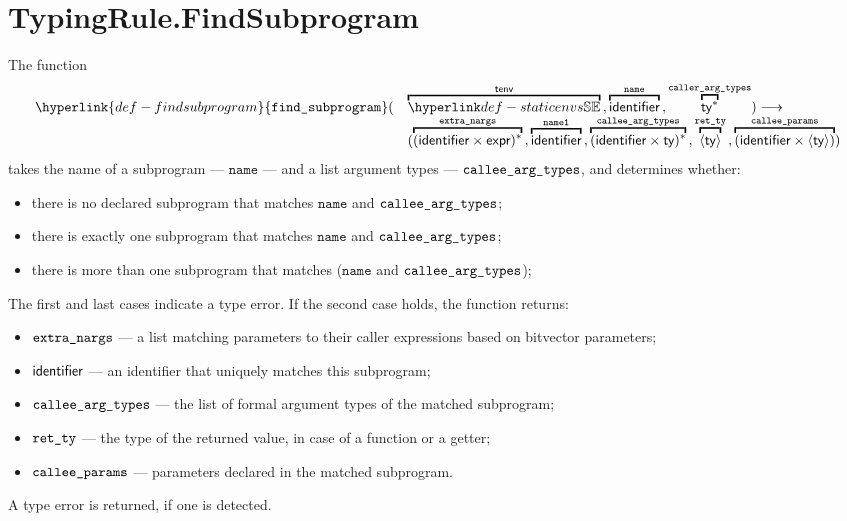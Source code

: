 \documentclass{book}
\newcommand\findsubprogram[0]{\hyperlink{def-findsubprogram}{\texttt{find\_subprogram}}}
\newcommand\nameone[0]{\texttt{name1}}
\newcommand\name[0]{\texttt{name}}
\begin{document}

\section{TypingRule.FindSubprogram \label{sec:TypingRule.FindSubprogram}}
\hypertarget{def-findsubprogram}{}
The function
\[
  \begin{array}{rl}
    \findsubprogram( &
      \overname{\staticenvs}{\tenv} \aslsep
      \overname{\identifier}{\name} \aslsep
      \overname{\ty^*}{\callerargtypes}
     ) \aslto \\ &
    (
      \overname{(\identifier\times\expr)^*}{\extranargs} \aslsep
      \overname{\identifier}{\nameone} \aslsep
      \overname{(\identifier\times\ty)^*}{\calleeargtypes} \aslsep
      \overname{\langle\ty\rangle}{\retty} \aslsep
      \overname{(\identifier \times \langle\ty\rangle)}{\calleeparams}
    )
  \end{array}
\]
takes the name of a subprogram --- $\name$ --- and a list argument types --- $\texttt{callee\_arg\_types}$,
and determines whether:
\begin{itemize}
  \item there is no declared subprogram that matches $\name$ and $\texttt{callee\_arg\_types}$;
  \item there is exactly one subprogram that matches $\name$ and $\texttt{callee\_arg\_types}$;
  \item there is more than one subprogram that matches ($\name$ and $\texttt{callee\_arg\_types}$);
\end{itemize}
The first and last cases indicate a type error.
If the second case holds, the function returns:
\begin{itemize}
\item $\texttt{extra\_nargs}$ --- a list matching parameters to their caller expressions based on bitvector parameters;
\item $\textsf{identifier}$ --- an identifier that uniquely matches this subprogram;
\item $\texttt{callee\_arg\_types}$ --- the list of formal argument types of the matched subprogram;
\item $\texttt{ret\_ty}$ --- the type of the returned value, in case of a function or a getter;
\item $\texttt{callee\_params}$ --- parameters declared in the matched subprogram.
\end{itemize}
A type error is returned, if one is detected.
\end{document}
